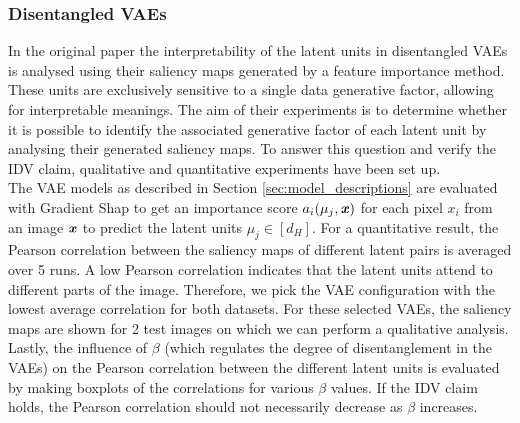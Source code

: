 \subsubsection{Disentangled VAEs} In the original paper the interpretability of the latent units in disentangled VAEs is analysed using their saliency maps generated by a feature importance method. These units are exclusively sensitive to a single data generative factor, allowing for interpretable meanings. The aim of their experiments is to determine whether it is possible to identify the associated generative factor of each latent unit by analysing their generated saliency maps. To answer this question and verify the IDV claim, qualitative and quantitative experiments have been set up. \\
The VAE models as described in Section \ref{sec:model_descriptions} are evaluated with Gradient Shap to get an importance score $a_i(\mu_j, \textbf{\textit{x}})$ for each pixel $x_i$ from an image $\textbf{\textit{x}}$ to predict the latent units $\mu_j \in 
[d_H]$. For a quantitative result, the Pearson correlation between the saliency maps of different latent pairs is averaged over 5 runs. A low Pearson correlation indicates that the latent units attend to different parts of the image. Therefore, we pick the VAE configuration with the lowest average correlation for both datasets. For these selected VAEs, the saliency maps are shown for 2 test images on which we can perform a qualitative analysis.
Lastly, the influence of $\beta$ (which regulates the degree of disentanglement in the VAEs) 
on the Pearson correlation between the different latent units is evaluated by making boxplots of the correlations for various $\beta$ values. If the IDV claim holds, the Pearson correlation should not necessarily decrease as $\beta$ increases.


